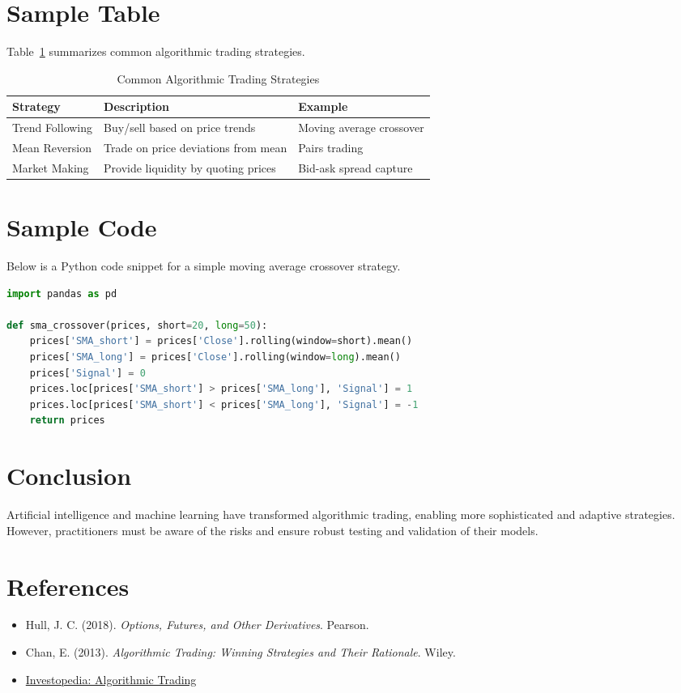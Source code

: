 \documentclass[10pt,a4paper]{article} %
\begin{document}
\newpage
\section{Sample Table}
Table~\ref{tab:strategies} summarizes common algorithmic trading strategies.

\begin{table}[h!]
\centering
\caption{Common Algorithmic Trading Strategies}
\label{tab:strategies}
\begin{tabular}{@{}lll@{}}
\toprule
Strategy & Description & Example \\
\midrule
Trend Following & Buy/sell based on price trends & Moving average crossover \\
Mean Reversion & Trade on price deviations from mean & Pairs trading \\
Market Making & Provide liquidity by quoting prices & Bid-ask spread capture \\
\bottomrule
\end{tabular}
\end{table}

\section{Sample Code}
Below is a Python code snippet for a simple moving average crossover strategy.

\begin{lstlisting}[language=Python, caption={Simple Moving Average Crossover}]
import pandas as pd

def sma_crossover(prices, short=20, long=50):
    prices['SMA_short'] = prices['Close'].rolling(window=short).mean()
    prices['SMA_long'] = prices['Close'].rolling(window=long).mean()
    prices['Signal'] = 0
    prices.loc[prices['SMA_short'] > prices['SMA_long'], 'Signal'] = 1
    prices.loc[prices['SMA_short'] < prices['SMA_long'], 'Signal'] = -1
    return prices
\end{lstlisting}

\section{Conclusion}
Artificial intelligence and machine learning have transformed algorithmic trading, enabling more sophisticated and adaptive strategies. However, practitioners must be aware of the risks and ensure robust testing and validation of their models.

\section{References}
\begin{itemize}
  \item Hull, J. C. (2018). \textit{Options, Futures, and Other Derivatives}. Pearson.
  \item Chan, E. (2013). \textit{Algorithmic Trading: Winning Strategies and Their Rationale}. Wiley.
  \item \href{https://www.investopedia.com/terms/a/algorithmictrading.asp}{Investopedia: Algorithmic Trading}
\end{itemize}
\end{document}
